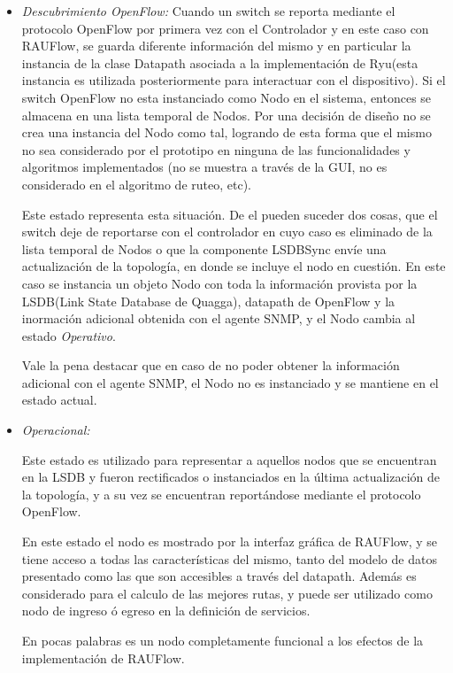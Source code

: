 \begin{itemize}
\item \textit{Descubrimiento OpenFlow:} Cuando un switch se reporta mediante el protocolo OpenFlow por primera vez con el Controlador y en este caso con RAUFlow, se guarda diferente informaci\'on del mismo y en particular la instancia de la clase Datapath asociada a la implementaci\'on de Ryu(esta instancia es utilizada posteriormente para interactuar con el dispositivo). Si el switch OpenFlow no esta instanciado como Nodo en el sistema, entonces se almacena en una lista temporal de Nodos. Por una decisión de diseño no se crea una instancia del Nodo como tal, logrando de esta forma que el mismo no sea considerado por el prototipo en ninguna de las funcionalidades y algoritmos implementados (no se muestra a través de la GUI, no es considerado en el algoritmo de ruteo, etc). 

Este estado representa esta situación. De el pueden suceder dos cosas, que el switch deje de reportarse con el controlador en cuyo caso es eliminado de la lista temporal de Nodos o que la componente LSDBSync envíe una actualizaci\'on de la topolog\'ia, en donde se incluye el nodo en cuestión. En este caso se instancia un objeto Nodo con toda la informaci\'on provista por la LSDB(Link State Database de Quagga), datapath de OpenFlow y la inormaci\'on adicional obtenida con el agente SNMP, y el Nodo cambia al estado \textit{Operativo}.

Vale la pena destacar que en caso de no poder obtener la informaci\'on adicional con el agente SNMP, el Nodo no es instanciado y se mantiene en el estado actual.

\item \textit{Operacional:}

Este estado es utilizado para representar a aquellos nodos que se encuentran en la LSDB y fueron rectificados o instanciados en la \'ultima actualizaci\'on de la topolog\'ia, y a su vez se encuentran report\'andose mediante el protocolo OpenFlow.

En este estado el nodo es mostrado por la interfaz gr\'afica de RAUFlow, y se tiene acceso a todas las características del mismo, tanto del modelo de datos presentado como las que son accesibles a trav\'es del datapath. Adem\'as es considerado para el calculo de las mejores rutas, y puede ser utilizado como nodo de ingreso \'o egreso en la definici\'on de servicios.

En pocas palabras es un nodo completamente funcional a los efectos de la implementaci\'on de RAUFlow.


\end{itemize}
